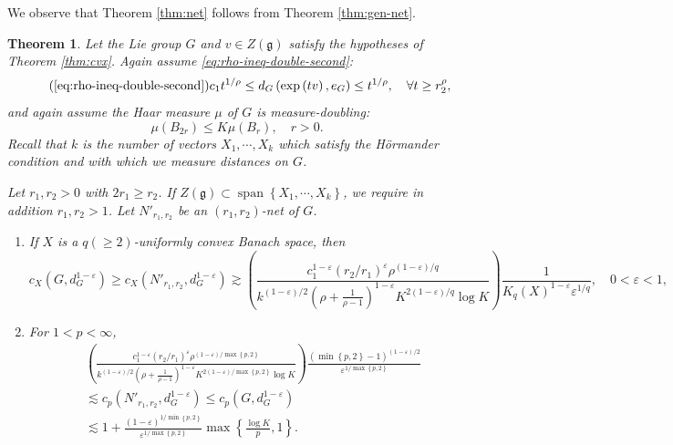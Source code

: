 \documentclass[11pt,reqno]{amsart}
\newtheorem{theorem}{Theorem}
\newcommand{\1}{\mathbf 1}
\begin{document}
We observe that Theorem \ref{thm:net} follows from Theorem \ref{thm:gen-net}.



\begin{theorem}\label{thm:gen-net-snowflake}
Let the Lie group $G$ and $v\in Z\left(\mathfrak{g}\right)$ satisfy the hypotheses of Theorem \ref{thm:cvx}. Again assume \eqref{eq:rho-ineq-double-second}:
\[\tag{\ref{eq:rho-ineq-double-second}}
	c_1t^{1/\rho}\le d_G\left(\exp\left(tv\right),e_G\right)\le t^{1/\rho}, \quad \forall t\ge r_2^\rho,
\]
and again assume the Haar measure $\mu$ of $G$ is measure-doubling:
\[
\mu\left(B_{2r}\right)\le K\mu\left(B_r\right),\quad r>0.
\]
Recall that $k$ is the number of vectors $X_1,\cdots,X_k$ which satisfy the H\"ormander condition and with which we measure distances on $G$.

Let $r_1,r_2>0$ with $2r_1\ge r_2$. If $Z\left(\mathfrak{g}\right)\subset \operatorname{span}\left\{X_1,\cdots,X_k\right\}$, we require in addition $r_1,r_2>1$. Let $N'_{r_1,r_2}$ be an $\left(r_1,r_2\right)$-net of $G$.


\begin{enumerate}
    \item  If $X$ is a $q(\ge 2)$-uniformly convex Banach space, then
\[
c_X\left(G,d_G^{1-\varepsilon}\right) \ge c_X\left(N'_{r_1,r_2},d_G^{1-\varepsilon}\right)\gtrsim \left(\frac{c_1^{1-\varepsilon}\left(r_2/r_1\right)^{\varepsilon}\rho^{\left(1-\varepsilon\right)/q}}{k^{\left(1-\varepsilon\right)/2}\left(\rho+\frac{1}{\rho-1}\right)^{1-\varepsilon} K^{2\left(1-\varepsilon\right)/q}\log K}\right)\frac{1}{K_q\left(X\right)^{1-\varepsilon}\varepsilon^{1/q}},\quad 0<\varepsilon<1,
\]
\item For $1<p<\infty$,
\begin{align*}
&\left(\frac{c_1^{1-\varepsilon}\left(r_2/r_1\right)^{\varepsilon}\rho^{\left(1-\varepsilon\right)/\max\left\{p,2\right\}}}{k^{\left(1-\varepsilon\right)/2}\left(\rho+\frac{1}{\rho-1}\right)^{1-\varepsilon} K^{2\left(1-\varepsilon\right)/\max\left\{p,2\right\}}\log K}\right)\frac{\left(\min\left\{p,2\right\}-1\right)^{(1-\varepsilon)/2}}{\varepsilon^{1/\max\left\{p,2\right\}}}\\
& \lesssim c_p\left(N'_{r_1,r_2},d_G^{1-\varepsilon}\right)\le c_p\left(G,d_G^{1-\varepsilon}\right)\\
&\lesssim 1+\frac{(1-\varepsilon)^{1/\min\left\{p,2\right\}}}{\varepsilon^{1/\max\left\{p,2\right\}}}\max\left\{\frac{\log K}{p},1\right\}.
\end{align*}
\end{enumerate}
\end{theorem}
\end{document}
